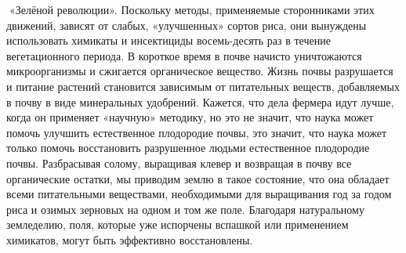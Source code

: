 \documentclass[a4paper]{book}
\begin{document}
«Зелёной революции». Поскольку методы, применяемые сторонниками этих движений,
зависят от слабых, «улучшенных» сортов риса, они вынуждены использовать химикаты и
инсектициды восемь-десять раз в течение вегетационного периода. В короткое время в почве
начисто уничтожаются микроорганизмы и сжигается органическое вещество. Жизнь почвы
разрушается и питание растений становится зависимым от питательных веществ,
добавляемых в почву в виде минеральных удобрений.
Кажется, что дела фермера идут лучше, когда он применяет «научную» методику, но это
не значит, что наука может помочь улучшить естественное плодородие почвы, это значит, что
наука может только помочь восстановить разрушенное людьми естественное плодородие
почвы. Разбрасывая солому, выращивая клевер и возвращая в почву все органические остатки,
мы приводим землю в такое состояние, что она обладает всеми питательными веществами,
необходимыми для выращивания год за годом риса и озимых зерновых на одном и том же
поле.
Благодаря натуральному земледелию, поля, которые уже испорчены вспашкой или
применением химикатов, могут быть эффективно восстановлены.
\end{document}
